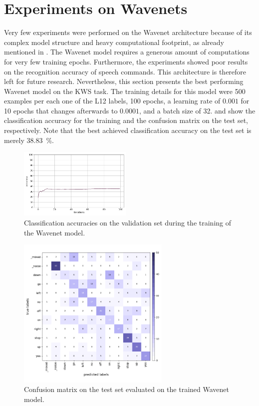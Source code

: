 
\section{Experiments on Wavenets}\label{exp_wavenet}
Very few experiments were performed on the Wavenet architecture because of its complex model structure and heavy computational footprint, as already mentioned in .
The Wavenet model requires a generous amount of computations for very few training epochs.
Furthermore, the experiments showed poor results on the recognition accuracy of speech commands.
This architecture is therefore left for future research.
Nevertheless, this section presents the best performing Wavenet model on the KWS task.
The training details for this model were 500 examples per each one of the L12 labels, 100 epochs, a learning rate of $0.001$ for 10 epochs that changes afterwards to $0.0001$, and a batch size of 32.
 and  show the classification accuracy for the training and the confusion matrix on the test set, respectively.
Note that the best achieved classification accuracy on the test set is merely \SI{38.83}{\percent}.
\begin{figure}[!ht]
  \centering
  \includegraphics[width=0.48\textwidth]{./5_exp/figs/exp_wavenet_acc.png}
  \caption{Classification accuracies on the validation set during the training of the Wavenet model.}
  \label{fig:exp_wavenet_acc}
\end{figure}
\begin{figure}[!ht]
  \centering
  \includegraphics[width=0.65\textwidth]{./5_exp/figs/exp_wavenet_confusion_test.png}
  \caption{Confusion matrix on the test set evaluated on the trained Wavenet model.}
  \label{fig:exp_wavenet_confusion}
\end{figure}
\FloatBarrier
\noindent